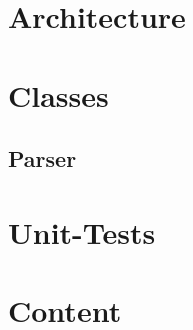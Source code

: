 
\section{Architecture}

\section{Classes}

\subsection{Parser}
\cite{Louden:1997:CCP:523017}

\section{Unit-Tests}

\section{Content}



